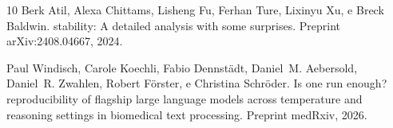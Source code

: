 \documentclass[12pt,a4paper]{article}
\begin{document}
\begin{thebibliography}{10}
Berk Atil, Alexa Chittams, Lisheng Fu, Ferhan Ture, Lixinyu Xu, e Breck Baldwin.
 stability: A detailed analysis with some surprises.
\newblock Preprint arXiv:2408.04667, 2024.

Paul Windisch, Carole Koechli, Fabio Dennstädt, Daniel~M. Aebersold,
  Daniel~R. Zwahlen, Robert Förster, e Christina Schröder.
\newblock Is one run enough? reproducibility of flagship large language models
  across temperature and reasoning settings in biomedical text processing.
\newblock Preprint medRxiv, 2026.

\end{thebibliography}
\end{document}
